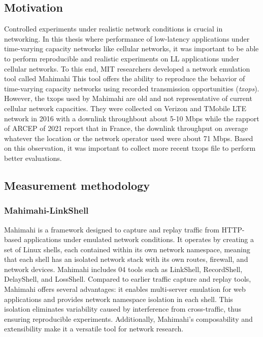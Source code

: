 
\subsection{Motivation}
Controlled experiments under realistic network conditions is crucial in networking. In this thesis where performance of low-latency applications under time-varying capacity networks like cellular networks, it was important to be able to perform reproducible and realistic experiments on LL applications under cellular networks. To this end, MIT researchers developed a network emulation tool called Mahimahi %
This tool offers the ability to reproduce the behavior of time-varying capacity networks using recorded transmission opportunities (\textit{txops}). However, the txops used by Mahimahi are old and not representative of current cellular network capacities. They were collected on Verizon and TMobile LTE network in 2016 with a downlink throughbout about 5-10 Mbps while the rapport of \ac{ARCEP} \cite{arcepQualitServices} of 2021 report that in France, the downlink throughput on average whatever the location or the network operator used were about 71 Mbps.  Based on this observation, it was important to collect more recent txops file to perform better evaluations.


\subsection{Measurement methodology}
\subsubsection{Mahimahi-LinkShell}
Mahimahi \cite{netravali2015mahimahi} is a framework designed to capture and replay traffic from HTTP-based applications under emulated network conditions. It operates by creating a set of Linux shells, each contained within its own network namespace, meaning that each shell has an isolated network stack with its own routes, firewall, and network devices. Mahimahi includes 04 tools such as LinkShell, RecordShell, DelayShell, and LossShell. Compared to earlier traffic capture and replay tools, Mahimahi offers several advantages: it enables multi-server emulation for web applications and provides network namespace isolation in each shell. This isolation eliminates variability caused by interference from cross-traffic, thus ensuring reproducible experiments. Additionally, Mahimahi's composability and extensibility make it a versatile tool for network research.

